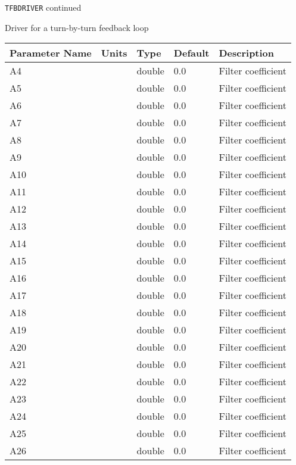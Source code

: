 \newpage
\begin{center}{\Large\verb|TFBDRIVER| continued}\end{center}
Driver for a turn-by-turn feedback loop
\\
\begin{tabular}{|l|l|l|l|p{\descwidth}|} \hline
Parameter Name & Units & Type & Default & Description \\ \hline 
A4 &  & double &  0.0 & Filter coefficient  \\ \hline 
A5 &  & double &  0.0 & Filter coefficient  \\ \hline 
A6 &  & double &  0.0 & Filter coefficient  \\ \hline 
A7 &  & double &  0.0 & Filter coefficient  \\ \hline 
A8 &  & double &  0.0 & Filter coefficient  \\ \hline 
A9 &  & double &  0.0 & Filter coefficient  \\ \hline 
A10 &  & double &  0.0 & Filter coefficient  \\ \hline 
A11 &  & double &  0.0 & Filter coefficient  \\ \hline 
A12 &  & double &  0.0 & Filter coefficient  \\ \hline 
A13 &  & double &  0.0 & Filter coefficient  \\ \hline 
A14 &  & double &  0.0 & Filter coefficient  \\ \hline 
A15 &  & double &  0.0 & Filter coefficient  \\ \hline 
A16 &  & double &  0.0 & Filter coefficient  \\ \hline 
A17 &  & double &  0.0 & Filter coefficient  \\ \hline 
A18 &  & double &  0.0 & Filter coefficient  \\ \hline 
A19 &  & double &  0.0 & Filter coefficient  \\ \hline 
A20 &  & double &  0.0 & Filter coefficient  \\ \hline 
A21 &  & double &  0.0 & Filter coefficient  \\ \hline 
A22 &  & double &  0.0 & Filter coefficient  \\ \hline 
A23 &  & double &  0.0 & Filter coefficient  \\ \hline 
A24 &  & double &  0.0 & Filter coefficient  \\ \hline 
A25 &  & double &  0.0 & Filter coefficient  \\ \hline 
A26 &  & double &  0.0 & Filter coefficient  \\ \hline 

\end{tabular}
